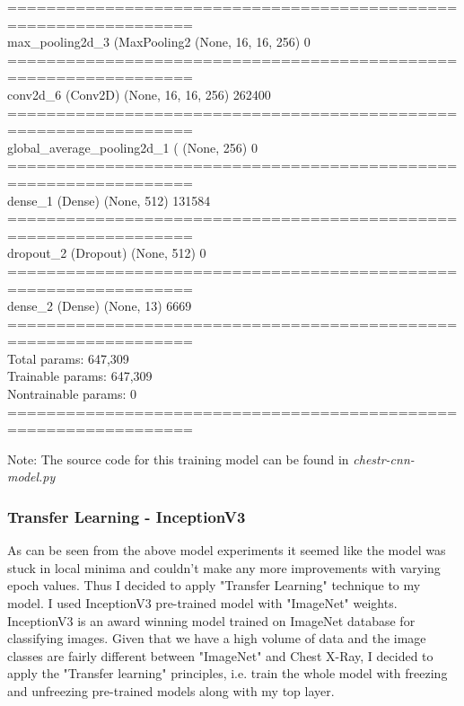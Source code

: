 \documentclass{article}
\begin{document}
{\begin{minipage}{\textwidth}
        =================================================================  \\ 
        max\_pooling2d\_3 (MaxPooling2 (None, 16, 16, 256)       0  \\ 
        =================================================================  \\ 
        conv2d\_6 (Conv2D)            (None, 16, 16, 256)       262400  \\ 
        =================================================================  \\ 
        global\_average\_pooling2d\_1 ( (None, 256)               0  \\ 
        =================================================================  \\ 
        dense\_1 (Dense)              (None, 512)               131584  \\ 
        =================================================================  \\ 
        dropout\_2 (Dropout)          (None, 512)               0  \\ 
        =================================================================  \\ 
        dense\_2 (Dense)              (None, 13)                6669  \\ 
        =================================================================  \\ 
        Total params: 647,309  \\ 
        Trainable params: 647,309  \\ 
        Nontrainable params: 0  \\ 
        =================================================================
    \end{minipage}}

    Note: The source code for this training model can be found in \textit{chestr-cnn-model.py}\cite{github-proj}

    \subsubsection{Transfer Learning - InceptionV3}  
    As can be seen from the above model experiments it seemed like the model was stuck in local minima and couldn't make any more improvements with varying epoch values. Thus I decided to apply "Transfer Learning" technique to my model. I used InceptionV3 pre-trained model with "ImageNet" weights. InceptionV3 is an award winning model trained on ImageNet database for classifying images. Given that we have a high volume of data and the image classes are fairly different between "ImageNet" and Chest X-Ray, I decided to apply the "Transfer learning" principles, i.e. train the whole model with freezing and unfreezing pre-trained models along with my top layer. 
\end{document}
